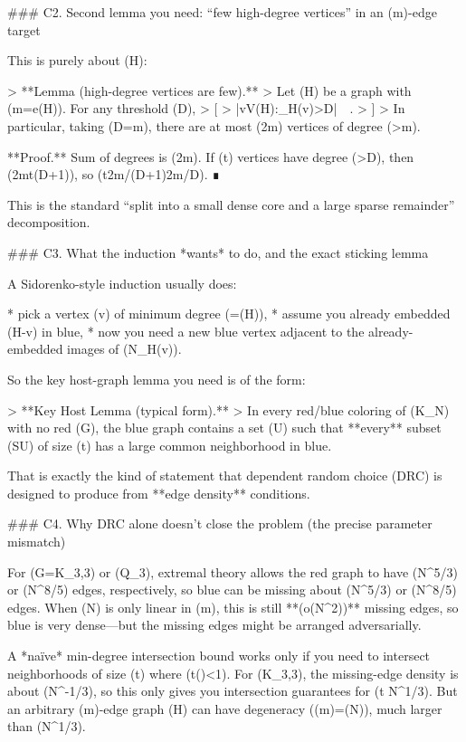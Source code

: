 ### C2. Second lemma you need: “few high-degree vertices” in an (m)-edge target

This is purely about (H):

> **Lemma (high-degree vertices are few).**
> Let (H) be a graph with (m=e(H)). For any threshold (D),
> [
> |{v\in V(H):\deg_H(v)>D}|\ \le\ .
> ]
> In particular, taking (D=\lceil \sqrt m\rceil), there are at most (2\sqrt m) vertices of degree (>\sqrt m).

**Proof.** Sum of degrees is (2m). If (t) vertices have degree (>D), then (2m\ge t(D+1)), so (t\le 2m/(D+1)\le 2m/D). ∎

This is the standard “split into a small dense core and a large sparse remainder” decomposition.

### C3. What the induction *wants* to do, and the exact sticking lemma

A Sidorenko-style induction usually does:

* pick a vertex (v) of minimum degree (\delta=\delta(H)),
* assume you already embedded (H-v) in blue,
* now you need a new blue vertex adjacent to the already-embedded images of (N_H(v)).

So the key host-graph lemma you need is of the form:

> **Key Host Lemma (typical form).**
> In every red/blue coloring of (K_N) with no red (G), the blue graph contains a set (U) such that **every** subset (S\subseteq U) of size (\le t) has a large common neighborhood in blue.

That is exactly the kind of statement that dependent random choice (DRC) is designed to produce from **edge density** conditions.

### C4. Why DRC alone doesn’t close the problem (the precise parameter mismatch)

For (G=K_{3,3}) or (Q_3), extremal theory allows the red graph to have (N^{5/3}) or (N^{8/5}) edges, respectively, so blue can be missing about (N^{5/3}) or (N^{8/5}) edges. When (N) is only linear in (m), this is still **(o(N^2))** missing edges, so blue is very dense—but the missing edges might be arranged adversarially.

A *naïve* min-degree intersection bound works only if you need to intersect neighborhoods of size (\le t) where (t\cdot()<1). For (K_{3,3}), the missing-edge density is about (N^{-1/3}), so this only gives you intersection guarantees for (t \ll N^{1/3}). But an arbitrary (m)-edge graph (H) can have degeneracy (\Theta(\sqrt m)=\Theta(\sqrt N)), much larger than (N^{1/3}).


